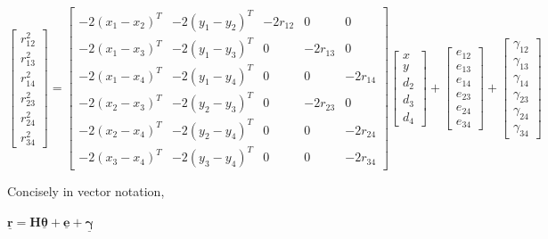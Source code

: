 \documentclass[a4 paper]{article}
\begin{document}
\[
\begin{bmatrix}
r_{12}^{2} \\ r_{13}^{2} \\ r_{14}^{2} \\ r_{23}^{2} \\ r_{24}^{2} \\ r_{34}^{2} 
\end{bmatrix}
= 
\begin{bmatrix}
- 2(x_{1} - x_{2})^{T} & - 2(y_{1} - y_{2})^{T} & -2r_{12} & 0 & 0  \\
- 2(x_{1} - x_{3})^{T} & - 2(y_{1} - y_{3})^{T} & 0 & -2r_{13} & 0  \\
- 2(x_{1} - x_{4})^{T} & - 2(y_{1} - y_{4})^{T} & 0 & 0 & -2r_{14}  \\
- 2(x_{2} - x_{3})^{T} & - 2(y_{2} - y_{3})^{T} & 0 & -2r_{23} & 0  \\
- 2(x_{2} - x_{4})^{T} & - 2(y_{2} - y_{4})^{T} & 0 & 0 & -2r_{24}  \\
- 2(x_{3} - x_{4})^{T} & - 2(y_{3} - y_{4})^{T} & 0 & 0 & -2r_{34} 
\end{bmatrix}
\begin{bmatrix}
x \\ y \\ d_{2} \\ d_{3} \\ d_{4}
\end{bmatrix}
+
\begin{bmatrix}
e_{12} \\ e_{13} \\ e_{14} \\ e_{23} \\ e_{24} \\ e_{34}
\end{bmatrix}
+
\begin{bmatrix}
\gamma_{12} \\ \gamma_{13} \\ \gamma_{14} \\ \gamma_{23} \\ \gamma_{24} \\ \gamma_{34} 
\end{bmatrix}
\]

Concisely in vector notation,
\\ \centerline{$ \mathbf{\underline{r}} = \mathbf{H}\mathbf{\underline{\theta}} + \mathbf{\underline{e}} +  \mathbf{\underline{\gamma}} $}
\end{document}
